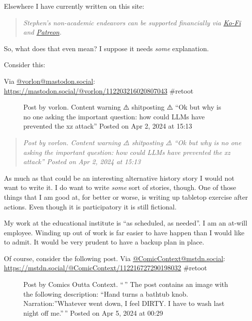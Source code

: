 Elsewhere I have currently written on this site:

\begin{quote}
\emph{Stephen's non-academic endeavors can be supported financially via
\href{https://ko-fi.com/smkellat}{Ko-Fi} and
\href{https://patreon.com/erielookingproductions}{Patreon}.}
\end{quote}

So, what does that even mean? I suppose it needs \emph{some}
explanation.

Consider this:

Via \href{https://mastodon.social/@vorlon/}{@vorlon@mastodon.social}:
\url{https://mastodon.social/@vorlon/112203216020807043} \#retoot

\begin{figure}
\centering
{}
\caption{Post by vorlon. Content warning ⚠️ shitposting ⚠️ ``Ok but why
is no one asking the important question: how could LLMs have prevented
the xz attack'' Posted on Apr 2, 2024 at 15:13}
\end{figure}

\begin{quote}
\emph{Post by vorlon. Content warning ⚠️ shitposting ⚠️ ``Ok but why is
no one asking the important question: how could LLMs have prevented the
xz attack'' Posted on Apr 2, 2024 at 15:13}
\end{quote}

As much as that could be an interesting alternative history story I
would not want to write it. I do want to write \emph{some} sort of
stories, though. One of those things that I am good at, for better or
worse, is writing up tabletop exercise after actions. Even though it is
participatory it is still fictional.

My work at the educational institute is ``as scheduled, as needed''. I
am an at-will employee. Winding up out of work is far easier to have
happen than I would like to admit. It would be very prudent to have a
backup plan in place.

Of course, consider the following post. Via
\href{https://mstdn.social/@ComicContext/}{@ComicContext@mstdn.social}:
\url{https://mstdn.social/@ComicContext/112216727290198032} \#retoot

\begin{figure}
\centering
{}
\caption{Post by Comics Outta Context. ``\,'' The post contains an image
with the following description: ``Hand turns a bathtub knob.
Narration:''Whatever went down, I feel DIRTY. I have to wash last night
off me.''\,'' Posted on Apr 5, 2024 at 00:29}
\end{figure}

